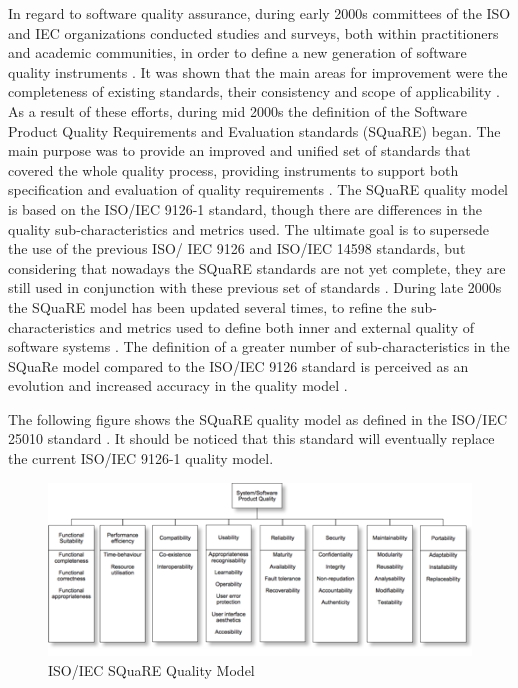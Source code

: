 \documentclass[10pt]{article}
\begin{document}
In regard to software quality assurance, during early 2000s committees of the ISO and IEC organizations conducted studies and surveys, both within practitioners and academic communities, in order to define a new generation of software quality instruments \cite{Suryn03}. It was shown that the main areas for improvement were the completeness of existing standards, their consistency and scope of applicability \cite{Suryn03}. As a result of these efforts, during mid 2000s the definition of the Software Product Quality Requirements and Evaluation standards (SQuaRE) began. The main purpose was to provide an improved and unified set of standards that covered the whole quality process, providing instruments to support both specification and evaluation of quality requirements \cite{Suryn03}. The SQuaRE quality model is based on the ISO/IEC 9126-1 standard, though there are differences in the quality sub-characteristics and metrics used. The ultimate goal is to supersede the use of the previous ISO/ IEC 9126 and ISO/IEC 14598 standards, but considering that nowadays the SQuaRE standards are not yet complete, they are still used in conjunction with these previous set of standards \cite{Ruiz08}. During late 2000s the SQuaRE model has been updated several times, to refine the sub-characteristics and metrics used to define both inner and external quality of software systems \cite{Ruiz08}. The definition of a greater number of sub-characteristics in the SQuaRe model compared to the ISO/IEC 9126 standard is perceived as an evolution and increased accuracy in the quality model \cite{Ruiz08}.

The following figure shows the SQuaRE quality model as defined in the ISO/IEC 25010 standard \cite{ISO09}. It should be noticed that this standard will eventually replace the current ISO/IEC 9126-1 quality model.

\begin{figure}[htbp]
	\centering
		\includegraphics[scale=0.55]{img/ISO_IEC_SQuaRE_Quality_Model.png}
	\caption{ISO/IEC SQuaRE Quality Model}
	\label{fig:ISO_IEC_SQuaRE_Quality_Model}
\end{figure}
\end{document}
